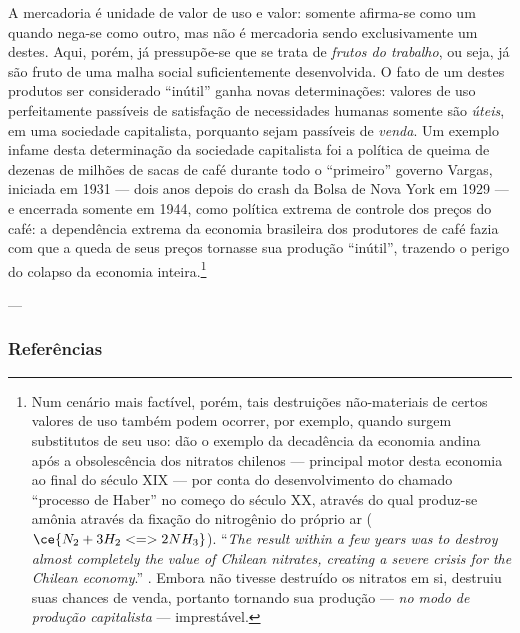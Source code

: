 A mercadoria é unidade de valor de uso e valor: somente afirma-se como um quando nega-se como outro, mas não é mercadoria sendo exclusivamente um destes. Aqui, porém, já pressupõe-se que se trata de \textit{frutos do trabalho}, ou seja, já são fruto de uma malha social suficientemente desenvolvida. O fato de um destes produtos ser considerado ``inútil'' ganha novas determinações: valores de uso perfeitamente passíveis de satisfação de necessidades humanas somente são \textit{úteis}, em uma sociedade capitalista, porquanto sejam passíveis de \textit{venda}. Um exemplo infame desta determinação da sociedade capitalista foi a política de queima de dezenas de milhões de sacas de café durante todo o ``primeiro'' governo Vargas, iniciada em 1931 — dois anos depois do crash da Bolsa de Nova York em 1929 — e encerrada somente em 1944, como política extrema de controle dos preços do café: a dependência extrema da economia brasileira dos produtores de café fazia com que a queda de seus preços tornasse sua produção ``inútil'', trazendo o perigo do colapso da economia inteira.\footnote{Num cenário mais factível, porém, tais destruições não-materiais de certos valores de uso também podem ocorrer, por exemplo, quando surgem substitutos de seu uso: \textcite{Foster2004} dão o exemplo da decadência da economia andina após a obsolescência dos nitratos chilenos — principal motor desta economia ao final do século XIX — por conta do desenvolvimento do chamado ``processo de Haber'' no começo do século XX, através do qual produz-se amônia através da fixação do nitrogênio do próprio ar ($\ce{ N_{2} + 3H_{2} <=> 2 NH_{3} }$). ``\textit{The result within a few years was to destroy almost completely the value of Chilean nitrates, creating a severe crisis for the Chilean economy}.'' \parencite[p. 192]{Foster2004}. Embora não tivesse destruído os nitratos em si, destruiu suas chances de venda, portanto tornando sua produção — \textit{no modo de produção capitalista} — imprestável. }

---
\subsubsection{Referências}

